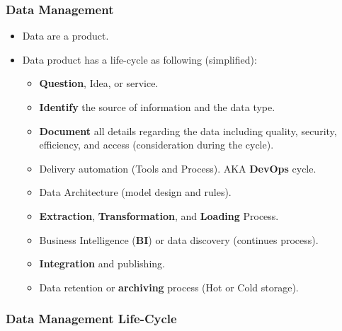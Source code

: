 \begin{frame}
\frametitle{Data Management}

\begin{itemize}[<+->]
\item Data are a product.
\item Data product has a life-cycle as following (simplified):
\begin{itemize}[<+->]
	\item \textbf{Question}, Idea, or service.
	\item \textbf{Identify} the source of information and the data type.
	\item \textbf{Document} all details regarding the data including quality, security, efficiency, and access (consideration during the cycle).
	\item Delivery automation (Tools and Process). AKA \textbf{DevOps} cycle.
	\item Data Architecture (model design and rules).
	\item \textbf{Extraction}, \textbf{Transformation}, and \textbf{Loading} Process.
	\item Business Intelligence (\textbf{BI}) or data discovery (continues process).
	\item \textbf{Integration} and publishing.
	\item Data retention or \textbf{archiving} process \forexample (Hot or Cold storage).
\end{itemize}
\end{itemize}

\end{frame}


\begin{frame}
\frametitle{Data Management Life-Cycle}
\end{frame}

\VideoClassification[column=2, colour=blue]

